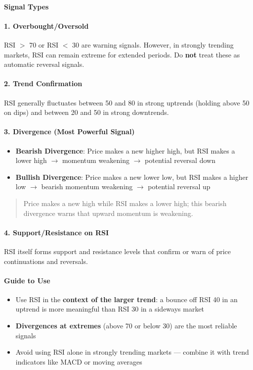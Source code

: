 \documentclass[12pt,openany]{book}
\begin{document}
\paragraph{Signal Types}

\paragraph{1. Overbought/Oversold}
RSI \(>\) 70 or RSI \(<\) 30 are warning signals. However, in strongly trending markets, RSI can remain extreme for extended periods. Do \textbf{not} treat these as automatic reversal signals.

\paragraph{2. Trend Confirmation}
RSI generally fluctuates between 50 and 80 in strong uptrends (holding above 50 on dips) and between 20 and 50 in strong downtrends.

\paragraph{3. Divergence (Most Powerful Signal)}
\begin{itemize}[leftmargin=*]
    \item \textbf{Bearish Divergence}: Price makes a new higher high, but RSI makes a lower high \(\rightarrow\) momentum weakening \(\rightarrow\) potential reversal down
    \item \textbf{Bullish Divergence}: Price makes a new lower low, but RSI makes a higher low \(\rightarrow\) bearish momentum weakening \(\rightarrow\) potential reversal up
\end{itemize}

\begin{quote}
Price makes a new high while RSI makes a lower high; this bearish divergence warns that upward momentum is weakening.
\end{quote}

\paragraph{4. Support/Resistance on RSI}
RSI itself forms support and resistance levels that confirm or warn of price continuations and reversals.

\paragraph{Guide to Use}
\begin{itemize}[leftmargin=*]
    \item Use RSI in the \textbf{context of the larger trend}: a bounce off RSI 40 in an uptrend is more meaningful than RSI 30 in a sideways market
    \item \textbf{Divergences at extremes} (above 70 or below 30) are the most reliable signals
    \item Avoid using RSI alone in strongly trending markets --- combine it with trend indicators like MACD or moving averages
\end{itemize}
\end{document}
